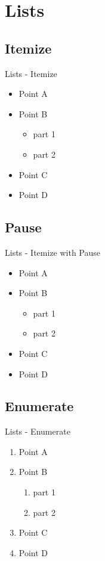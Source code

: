 \section{Lists}
\subsection{Itemize}
\label{itemize}
\begin{frame}{Lists - Itemize}
  \begin{itemize}
    \item Point A
    \item Point B
    \begin{itemize}
      \item part 1
      \item part 2
    \end{itemize}
    \item Point C
    \item Point D
  \end{itemize}
\end{frame}

\subsection{Pause}
\label{pause}
\begin{frame}{Lists - Itemize with Pause}
  \begin{itemize}[<+->]
     \item Point A
     \item Point B
    \begin{itemize}
       \item part 1
       \item part 2
    \end{itemize}
     \item Point C
     \item Point D
  \end{itemize}
\end{frame}

\subsection{Enumerate}
\label{enumerate}
\begin{frame}{Lists - Enumerate}
  \begin{enumerate}
    \item Point A
    \item Point B
    \begin{enumerate}
      \item part 1
      \item part 2
    \end{enumerate}
    \item Point C
    \item Point D
  \end{enumerate}
\end{frame}

